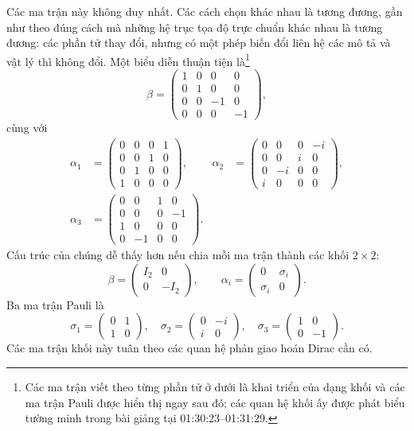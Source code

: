 Các ma trận này không duy nhất. Các cách chọn khác nhau là tương đương, gần như theo đúng cách mà những hệ trục tọa độ trực chuẩn khác nhau là tương đương: các phần tử thay đổi, nhưng có một phép biến đổi liên hệ các mô tả và vật lý thì không đổi. Một biểu diễn thuận tiện là\footnote{Các ma trận viết theo từng phần tử ở dưới là khai triển của dạng khối và các ma trận Pauli được hiển thị ngay sau đó; các quan hệ khối ấy được phát biểu tường minh trong bài giảng tại 01:30:23--01:31:29.}
\begin{equation}
\beta=
\begin{pmatrix}
1&0&0&0\\
0&1&0&0\\
0&0&-1&0\\
0&0&0&-1
\end{pmatrix},
\end{equation}
cùng với
\begin{align}
\alpha_1&=
\begin{pmatrix}
0&0&0&1\\
0&0&1&0\\
0&1&0&0\\
1&0&0&0
\end{pmatrix},
&
\alpha_2&=
\begin{pmatrix}
0&0&0&-i\\
0&0&i&0\\
0&-i&0&0\\
i&0&0&0
\end{pmatrix},
\\[1ex]
\alpha_3&=
\begin{pmatrix}
0&0&1&0\\
0&0&0&-1\\
1&0&0&0\\
0&-1&0&0
\end{pmatrix}.
\end{align}
Cấu trúc của chúng dễ thấy hơn nếu chia mỗi ma trận thành các khối \(2\times2\):
\begin{equation}
\beta=
\begin{pmatrix}
I_2&0\\
0&-I_2
\end{pmatrix},
\qquad
\alpha_i=
\begin{pmatrix}
0&\sigma_i\\
\sigma_i&0
\end{pmatrix}.
\end{equation}
Ba ma trận Pauli là
\begin{equation}
\sigma_1=
\begin{pmatrix}
0&1\\
1&0
\end{pmatrix},
\quad
\sigma_2=
\begin{pmatrix}
0&-i\\
i&0
\end{pmatrix},
\quad
\sigma_3=
\begin{pmatrix}
1&0\\
0&-1
\end{pmatrix}.
\end{equation}
Các ma trận khối này tuân theo các quan hệ phản giao hoán Dirac cần có.

